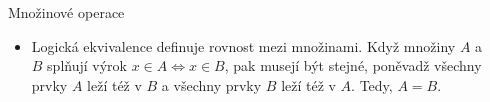 \documentclass[final]{beamer}
\newlength{\sepwidth}
\newlength{\colwidth}
\newcommand{\separatorcolumn}{
  \begin{column}{\sepwidth}
\end{column}}
\newcommand{\mytria}{\tikz[baseline=-3.25pt]{%
    \node[isosceles triangle,isosceles triangle apex angle=60,draw,thick,inner
    sep=3.25pt,rotate=90] at (0,0) {};
}}
\newcommand{\mycirc}{\tikz[baseline=-7pt]{%
    \node[circle,draw,thick,inner sep=4.5pt,baseline=0.5ex,rotate=90]
    at (0,0) {};
}}
\begin{document}
\begin{frame}[t]
\begin{columns}[t]
\begin{column}{\colwidth}
\begin{alertblock}{Množinové operace}
\begin{itemize}[left=40pt]
            Fakt, že $A$ je podmnožina $B$ píšeme jako $A \subseteq B$. Množina
            $A$ smí obsahovat pouze prvky, které obsahuje rovněž $B$, ale ne
            nutně všechny. Všechny podmnožiny množiny $B
            = \{\mytria,\mycirc\}$ jsou vypsány níže.
            \[
              \{\}, \{\mytria\}, \{\mycirc\}, \{\mytria,\mycirc\},
            \]
            kde $\{\}$ je \alert{prázdná množina} -- množina bez prvků.
          \item[($ \Leftrightarrow $)] 
            Logická ekvivalence definuje \alert{rovnost} mezi množinami. Když
            množiny $A$ a $B$ splňují výrok ${x \in A \Leftrightarrow x \in B}$,
            pak musejí být stejné, poněvadž všechny prvky $A$ leží též v $B$ a
            všechny prvky $B$ leží též v $A$. Tedy, $A = B$.
        \end{itemize}
      \end{alertblock}

    \end{column}
    \separatorcolumn


\end{columns}
\end{frame}
\end{document}

